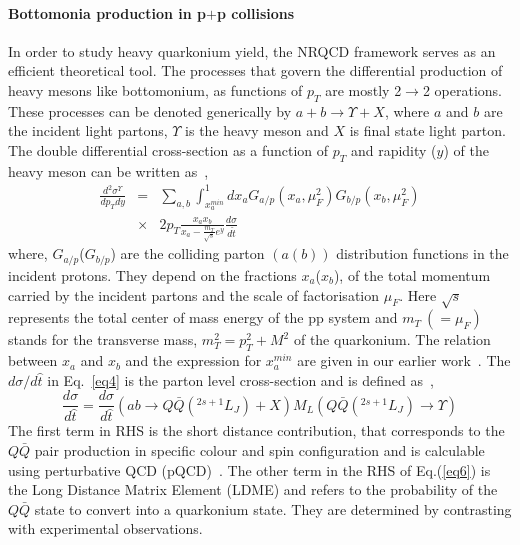 \paragraph{Bottomonia production in p$+$p collisions}
\label{sec:formalism}
In order to study heavy quarkonium yield, the NRQCD framework serves as an
efficient theoretical tool. The processes that govern the differential
production of heavy mesons like bottomonium, as functions of $p_T$ are mostly
2$\rightarrow$2 operations. These processes can be denoted generically by 
$a+b\rightarrow \Upsilon +X$, where $a$ and $b$ are the incident light partons,
$\Upsilon$ is the heavy meson and $X$ is final state light parton.
The double differential cross-section as a function of $p_T$ and rapidity ($y$) of 
the heavy meson can be written as~\cite{Kumar:2016ojy},
\begin{eqnarray}
  \nonumber
  \frac{d^2\sigma^{\Upsilon} }{dp_T dy} &=& \sum_{a,b} \int_{x_a^{min}}^1 dx_a G_{a/p}(x_a,\mu_F^2)
  G_{b/p}(x_b,\mu_F^2) \\
  &\times& 2p_T\frac{x_a x_b}{x_a - \frac{m_T}{\sqrt{s}}e^y}\frac{d\sigma}{d\hat{t}}
  \label{eq4}
\end{eqnarray}
where, $G_{a/p}$($G_{b/p}$) are the colliding parton $(a(b))$ distribution functions in
the incident protons. They depend on the fractions $x_a$($x_b$), of the total momentum
carried by the incident partons and the scale of factorisation $\mu_F$.
Here $\sqrt{s}$ represents the total center of mass energy of the pp system and $m_T~(=\mu_F)$ stands for
the transverse mass, $m_T^2=p_T^2 + M^2$ of the quarkonium. The relation between
$x_a$ and $x_b$ and the expression for $x_a^{min}$ are given in our earlier work~\cite{Kumar:2016ojy}.
The ${d\sigma}/{d\hat{t}}$ in Eq.~\ref{eq4} is the parton level cross-section and is
defined as~\cite{Bodwin:1994jh},
\begin{equation}
  \frac{d\sigma}{d\hat{t}} = \frac{d\sigma}{d\hat{t}}(ab\rightarrow Q\bar{Q}(^{2s+1}L_J)+X)
  M_L(Q\bar{Q}(^{2s+1}L_J)\rightarrow \Upsilon)
  \label{eq6}
\end{equation}
The first term in RHS is the short distance contribution, that corresponds to the $Q\bar{Q}$
pair production in specific colour and spin configuration and is calculable using 
perturbative QCD (pQCD)~\cite{Brateen:PRD2001,Baier:1983va,Humpert:1986cy,Gastmans:1987be,Cho:1995vh,Cho:1995ce}.
The other term in the RHS of Eq.(\ref{eq6}) is the Long Distance Matrix Element (LDME)
and refers to the probability of the $Q\bar{Q}$ state to convert into a quarkonium state.
They are determined by contrasting with experimental observations. 




